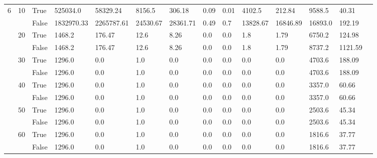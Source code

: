 \begin{landscape}
\begin{small}
\begin{longtable}[c]{@{}lll|ll|ll|ll|ll|lll@{}}
  \midrule
6  & 10 & True  & 525034.0        & 58329.24       & 8156.5        & 306.18        & 0.09          & 0.01          & 4102.5        & 212.84        & 9588.5        & 40.31       &  \\
   &    & False & 1832970.33      & 2265787.61     & 24530.67      & 28361.71      & 0.49          & 0.7           & 13828.67      & 16846.89      & 16893.0       & 192.19      &  \\
   & 20 & True  & 1468.2          & 176.47         & 12.6          & 8.26          & 0.0           & 0.0           & 1.8           & 1.79          & 6750.2        & 124.98      &  \\
   &    & False & 1468.2          & 176.47         & 12.6          & 8.26          & 0.0           & 0.0           & 1.8           & 1.79          & 8737.2        & 1121.59     &  \\
   & 30 & True  & 1296.0          & 0.0            & 1.0           & 0.0           & 0.0           & 0.0           & 0.0           & 0.0           & 4703.6        & 188.09      &  \\
   &    & False & 1296.0          & 0.0            & 1.0           & 0.0           & 0.0           & 0.0           & 0.0           & 0.0           & 4703.6        & 188.09      &  \\
   & 40 & True  & 1296.0          & 0.0            & 1.0           & 0.0           & 0.0           & 0.0           & 0.0           & 0.0           & 3357.0        & 60.66       &  \\
   &    & False & 1296.0          & 0.0            & 1.0           & 0.0           & 0.0           & 0.0           & 0.0           & 0.0           & 3357.0        & 60.66       &  \\
   & 50 & True  & 1296.0          & 0.0            & 1.0           & 0.0           & 0.0           & 0.0           & 0.0           & 0.0           & 2503.6        & 45.34       &  \\
   &    & False & 1296.0          & 0.0            & 1.0           & 0.0           & 0.0           & 0.0           & 0.0           & 0.0           & 2503.6        & 45.34       &  \\
   & 60 & True  & 1296.0          & 0.0            & 1.0           & 0.0           & 0.0           & 0.0           & 0.0           & 0.0           & 1816.6        & 37.77       &  \\
   &    & False & 1296.0          & 0.0            & 1.0           & 0.0           & 0.0           & 0.0           & 0.0           & 0.0           & 1816.6        & 37.77       &  \\

\end{longtable}
\end{small}
\end{landscape}
